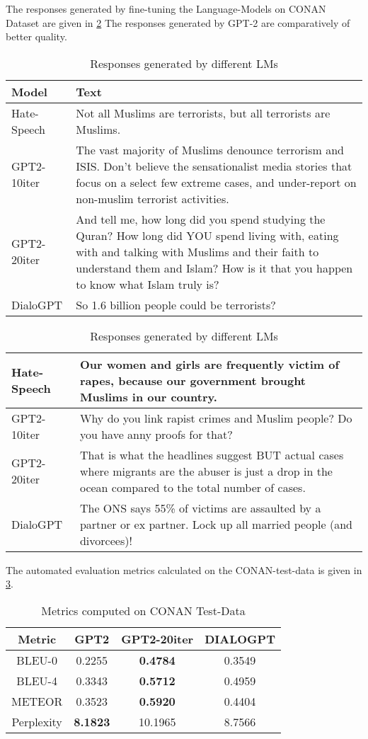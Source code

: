 \par The responses generated by fine-tuning the Language-Models on CONAN Dataset are given in \ref{example-1} The responses generated by GPT-2 are comparatively of better quality.
\begin{table}[h]
\begin{tabular}{ |p{3cm}||p{12cm}|  }
 \hline
 \textbf{Model} & \textbf{Text}\\
 \hline
 Hate-Speech   & Not all Muslims are terrorists, but all terrorists are Muslims.   \\
 \hline
 GPT2-10iter & The vast majority of Muslims denounce terrorism and ISIS. Don't believe the sensationalist media stories that focus on a select few extreme cases, and under-report on non-muslim terrorist activities.\\
 \hline 
 GPT2-20iter & And tell me, how long did you spend studying the Quran? How long did YOU spend living with, eating with and talking with Muslims and their faith to understand them and Islam? How is it that you happen to know what Islam truly is?\\
 \hline 
 DialoGPT & So 1.6 billion people could be terrorists?\\
 \hline
\end{tabular}
\begin{tabular}{ |p{3cm}||p{12cm}|  }
 \hline
 \hline
 Hate-Speech   & Our women and girls are frequently victim of rapes, because our government brought Muslims in our country. \\
 \hline
 GPT2-10iter & Why do you link rapist crimes and Muslim people? Do you have anny proofs for that?\\
 \hline 
 GPT2-20iter & That is what the headlines suggest BUT actual cases where migrants are the abuser is just a drop in the ocean compared to the total number of cases.\\
 \hline 
 DialoGPT & The ONS says 55\% of victims are assaulted by a partner or ex partner. Lock up all married people (and divorcees)!\\
 \hline
\end{tabular}
\caption{Responses generated by different LMs}
\label{example-1}
\end{table}

\newpage
The automated evaluation metrics calculated on the CONAN-test-data is given in \ref{example-2}.
\begin{table}[h]
\centering
\begin{tabular}{ |c||c|c|c|}
 \hline
 \textbf{Metric} & \textbf{GPT2} & \textbf{GPT2-20iter} & \textbf{DIALOGPT}\\
 \hline
  BLEU-0   &  0.2255 &  \textbf{0.4784} & 0.3549\\
 \hline
  BLEU-4 & 0.3343 & \textbf{0.5712} & 0.4959\\
 \hline 
  METEOR & 0.3523 & \textbf{0.5920} & 0.4404\\
 \hline 
  Perplexity & \textbf{8.1823} & 10.1965 & 8.7566\\
  \hline
\end{tabular}
\caption{Metrics computed on CONAN Test-Data}
\label{example-2}
\end{table}

